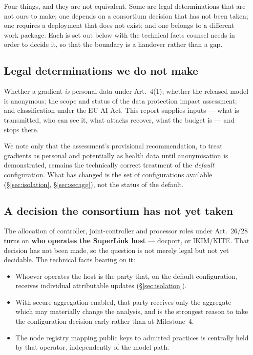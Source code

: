 \label{sec:outside}
\statusOutside

\begin{shortanswer}
Four things, and they are not equivalent. Some are legal determinations that are not ours to make;
one depends on a consortium decision that has not been taken; one requires a deployment that does
not exist; and one belongs to a different work package. Each is set out below with the technical
facts counsel needs in order to decide it, so that the boundary is a handover rather than a gap.
\end{shortanswer}

\subsection{Legal determinations we do not make}

Whether a gradient \emph{is} personal data under Art.~4(1); whether the released model is anonymous;
the scope and status of the data protection impact assessment; and classification under the EU AI
Act. This report supplies inputs --- what is transmitted, who can see it, what attacks recover, what
the budget is --- and stops there.

We note only that the assessment's provisional recommendation, to treat gradients as personal and
potentially as health data until anonymisation is demonstrated, remains the technically correct
treatment of the \emph{default} configuration. What has changed is the set of configurations
available (\S\ref{sec:isolation}, \S\ref{sec:secagg}), not the status of the default.

\subsection{A decision the consortium has not yet taken}

The allocation of controller, joint-controller and processor roles under Art.~26/28 turns on
\textbf{who operates the SuperLink host} --- docport, or IKIM/KITE. That decision has not been made,
so the question is not merely legal but not yet decidable. The technical facts bearing on it:

\begin{itemize}
  \item Whoever operates the host is the party that, on the default configuration, receives
        individual attributable updates (\S\ref{sec:isolation}).
  \item With secure aggregation enabled, that party receives only the aggregate --- which may
        materially change the analysis, and is the strongest reason to take the configuration
        decision early rather than at Milestone~4.
  \item The node registry mapping public keys to admitted practices is centrally held by that
        operator, independently of the model path.
\end{itemize}

